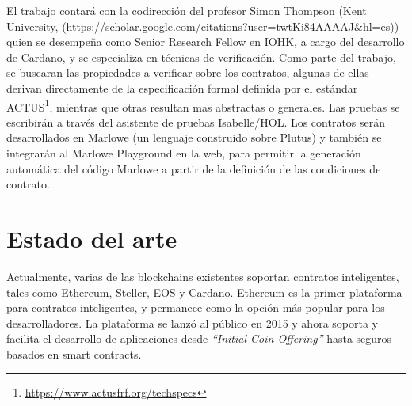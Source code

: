 \documentclass[12pt]{book}
\begin{document}
El trabajo contará con la codirección del profesor Simon Thompson (Kent University, (\url{https://scholar.google.com/citations?user=twtKi84AAAAJ&hl=es})) quien se desempeña como Senior Research Fellow en IOHK, a cargo del desarrollo de Cardano, y se especializa en técnicas de verificación. Como parte del trabajo, se buscaran las propiedades a verificar sobre los contratos, algunas de ellas derivan directamente de la especificación formal definida por el estándar ACTUS\footnote{\href{https://www.actusfrf.org/techspecs}{https://www.actusfrf.org/techspecs}}, mientras que otras resultan mas abstractas o generales. Las pruebas se escribirán a través del asistente de pruebas Isabelle/HOL. Los contratos serán desarrollados en Marlowe (un lenguaje construído sobre Plutus) y también se integrarán al Marlowe Playground en la web, para permitir la generación automática del código Marlowe a partir de la definición de las condiciones de contrato. %







\section{Estado del arte}

Actualmente, varias de las blockchains existentes soportan contratos inteligentes, tales como Ethereum, Steller, EOS y Cardano. Ethereum es la primer plataforma para contratos inteligentes, y permanece como la opción más popular para los desarrolladores. La plataforma se lanzó al público en 2015 y ahora soporta y facilita el desarrollo de aplicaciones desde \textit{``Initial Coin Offering''} hasta seguros basados en smart contracts.
\end{document}
